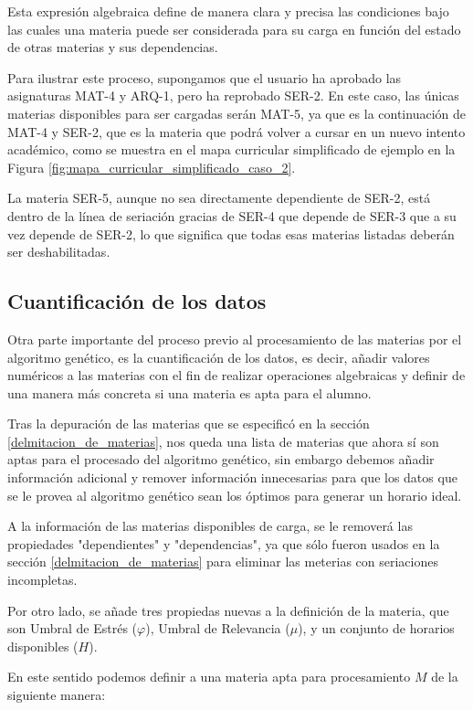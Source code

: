 Esta expresión algebraica define de manera clara y precisa las condiciones bajo las cuales una materia puede ser considerada para su carga en función del estado de otras materias y sus dependencias.

Para ilustrar este proceso, supongamos que el usuario ha aprobado las asignaturas MAT-4 y ARQ-1, pero ha reprobado SER-2. En este caso, las únicas materias disponibles para ser cargadas serán MAT-5, ya que es la continuación de MAT-4 y SER-2, que es la materia que podrá volver a cursar en un nuevo intento académico, como se muestra en el mapa curricular simplificado de ejemplo en la Figura \ref{fig:mapa_curricular_simplificado_caso_2}.


La materia SER-5, aunque no sea directamente dependiente de SER-2, está dentro de la línea de seriación gracias de SER-4 que depende de SER-3 que a su vez depende de SER-2, lo que significa que todas esas materias listadas deberán ser deshabilitadas.

\subsection{Cuantificación de los datos} \label{cuantifiacion_de_datos}

Otra parte importante del proceso previo al procesamiento de las materias por el algoritmo genético, es la cuantificación de los datos, es decir, añadir valores numéricos a las materias con el fin de realizar operaciones algebraicas y definir de una manera más concreta si una materia es apta para el alumno.

Tras la depuración de las materias que se especificó en la sección \ref{delmitacion_de_materias}, nos queda una lista de materias que ahora sí son aptas para el procesado del algoritmo genético, sin embargo debemos añadir información adicional y remover información innecesarias para que los datos que se le provea al algoritmo genético sean los óptimos para generar un horario ideal.

A la información de las materias disponibles de carga, se le removerá las propiedades "dependientes" y "dependencias", ya que sólo fueron usados en la sección \ref{delmitacion_de_materias} para eliminar las meterias con seriaciones incompletas.

Por otro lado, se añade tres propiedas nuevas a la definición de la materia, que son Umbral de Estrés (\( \varphi \)), Umbral de Relevancia ($ \mu  $), y un conjunto de horarios disponibles (\( H \)).

En este sentido podemos definir a una materia apta para procesamiento \( M \) de la siguiente manera:

